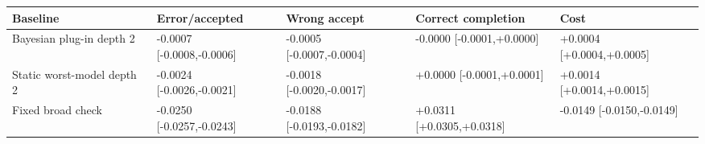 \begin{tabular}{@{}lllll@{}}
\toprule
Baseline & Error/accepted & Wrong accept & Correct completion & Cost\\
\midrule
Bayesian plug-in depth 2 & -0.0007 [-0.0008,-0.0006] & -0.0005 [-0.0007,-0.0004] & -0.0000 [-0.0001,+0.0000] & +0.0004 [+0.0004,+0.0005]\\
Static worst-model depth 2 & -0.0024 [-0.0026,-0.0021] & -0.0018 [-0.0020,-0.0017] & +0.0000 [-0.0001,+0.0001] & +0.0014 [+0.0014,+0.0015]\\
Fixed broad check & -0.0250 [-0.0257,-0.0243] & -0.0188 [-0.0193,-0.0182] & +0.0311 [+0.0305,+0.0318] & -0.0149 [-0.0150,-0.0149]\\
\bottomrule
\end{tabular}
